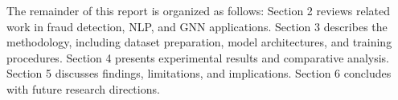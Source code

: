\documentclass[12pt,a4paper]{article}
\begin{document}
The remainder of this report is organized as follows: Section 2 reviews related work in fraud detection, NLP, and GNN applications. Section 3 describes the methodology, including dataset preparation, model architectures, and training procedures. Section 4 presents experimental results and comparative analysis. Section 5 discusses findings, limitations, and implications. Section 6 concludes with future research directions.









\appendix

\end{document}
